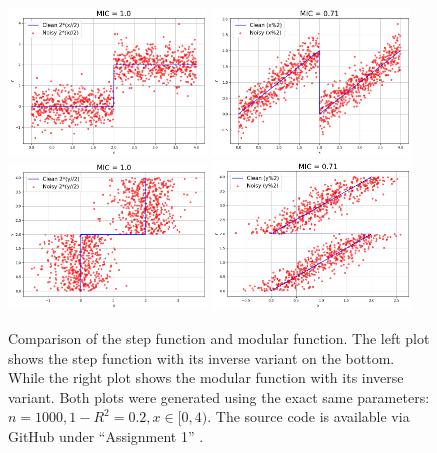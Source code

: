 \documentclass{article}
\begin{document}
\begin{figure}
    \centering
    \includegraphics[width=0.47\textwidth]{images/step1.png}
    \includegraphics[width=0.47\textwidth]{images/mod1.png}
    \includegraphics[width=0.47\textwidth]{images/step2.png}
    \includegraphics[width=0.47\textwidth]{images/mod2.png}
    \caption{Comparison of the step function and modular function. The left plot shows the step function with its inverse variant on the bottom. While the right plot shows the modular function with its inverse variant. Both plots were generated using the exact same parameters: $n = 1000, 1-R^2=0.2, x\in [0, 4)$. The source code is available via GitHub under ``Assignment 1'' \citep{src}.}
    \label{fig:step_mod}
\end{figure}
\end{document}
